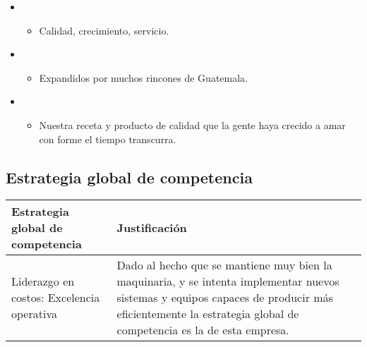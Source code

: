\documentclass{article}
\begin{document}
\begin{itemize}
\begin{itemize}
            \item {} 
                \begin{itemize}
                    \item Calidad, crecimiento, servicio.
                \end{itemize}
                
            \item {} 
                \begin{itemize}
                    \item Expandidos por muchos rincones de Guatemala. 
                \end{itemize}
                
            \item {} 
                \begin{itemize}
                    \item Nuestra receta y producto de calidad que la gente haya crecido a amar con forme el tiempo transcurra.
                \end{itemize}
                
        \end{itemize}
\end{itemize}



\subsection{Estrategia global de competencia}
\begin{center}
    \begin{tabular}{ |p{3cm}|p{8cm}| }
        \hline
            Estrategia global de competencia & Justificación \\
        \hline
            Liderazgo en costos: Excelencia operativa & Dado al hecho que se mantiene muy bien la maquinaria, y se intenta implementar nuevos sistemas y equipos capaces de producir más eficientemente la estrategia global de competencia es la de esta empresa. \\ 
        \hline
    \end{tabular}
\end{center}



\end{document}
